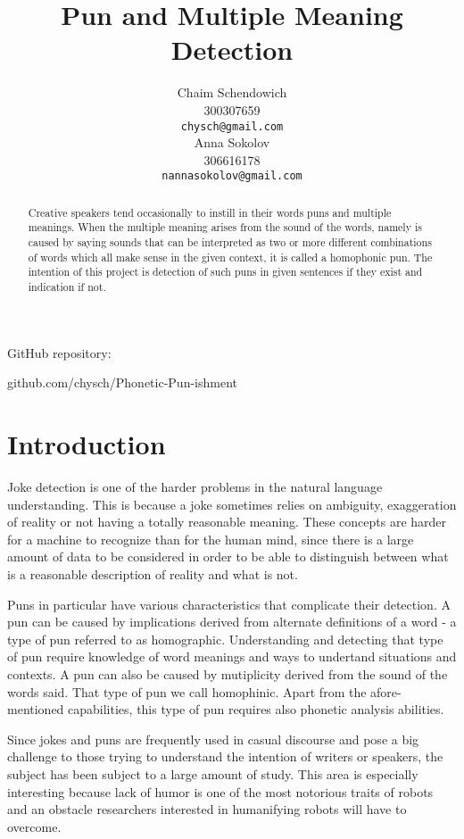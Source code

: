 \documentclass[11pt,a4paper]{article}
\title{Pun and Multiple Meaning Detection}
\author{Chaim Schendowich \\
  300307659 \\
  {\tt chysch@gmail.com} \\\And
  Anna Sokolov \\
  306616178 \\
  {\tt nannasokolov@gmail.com} \\}
\date{}
\begin{document}
\maketitle
\small{
GitHub repository:

github.com/chysch/Phonetic-Pun-ishment}

\hfill

\begin{abstract}
Creative speakers tend occasionally to instill in their words puns and multiple meanings. When the multiple meaning arises from the sound of the words, namely is caused by saying sounds that can be interpreted as two or more different combinations of words which all make sense in the given context, it is called a homophonic pun. The intention of this project is detection of such puns in given sentences if they exist and indication if not.
\end{abstract}

\section{Introduction}

Joke detection is one of the harder problems in the natural language understanding. This is because a joke sometimes relies on ambiguity, exaggeration of reality or not having a totally reasonable meaning. These concepts are harder for a machine to recognize than for the human mind, since there is a large amount of data to be considered in order to be able to distinguish between what is a reasonable description of reality and what is not.

Puns in particular have various characteristics that complicate their detection. A pun can be caused by implications derived from alternate definitions of a word - a type of pun referred to as homographic. Understanding and detecting that type of pun require knowledge of word meanings and ways to undertand situations and contexts. A pun can also be caused by mutiplicity derived from the sound of the words said. That type of pun we call homophinic. Apart from the afore-mentioned capabilities, this type of pun requires also phonetic analysis abilities.

Since jokes and puns are frequently used in casual discourse and pose a big challenge to those trying to understand the intention of writers or speakers, the subject has been subject to a large amount of study. This area is especially interesting because lack of humor is one of the most notorious traits of robots and an obstacle researchers interested in humanifying robots will have to overcome.
\end{document}
